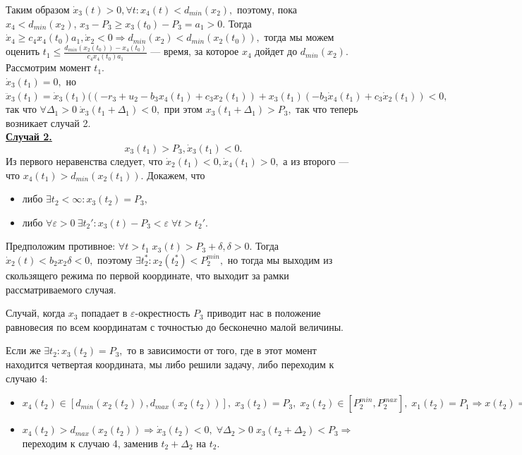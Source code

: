 \documentclass[11pt]{article}
\theoremstyle{definition}
\begin{document}
Таким образом $\dot x_3(t) > 0, \forall t : x_4(t) < d_{min}(x_2),$ поэтому, пока $x_4 < d_{min}(x_2)$, $ x_3 - P_3 \geqslant x_3(t_0) - P_3 = a_1 > 0.$ Тогда $\dot x_4 \geqslant c_4x_4(t_0)a_1, \dot x_2 < 0 \Rightarrow d_{min}(x_2) < d_{min}(x_2(t_0)),$ тогда мы можем оценить $t_1 \leqslant \frac{d_{min}(x_2(t_0)) - x_4(t_0)}{c_4x_4(t_0)a_1}$ --- время, за которое $x_4$ дойдет до $d_{min}(x_2)$.\\
Рассмотрим момент $t_1.$ \\
$\dot x_3(t_1) = 0,$ но $\ddot x_3(t_1) = \dot x_3(t_1)((-r_3 + u_2 - b_3x_4(t_1) + c_3x_2(t_1)) + x_3(t_1)(-b_3\dot x_4(t_1) + c_3 \dot x_2(t_1)) < 0,$ так что $\forall \Delta_1 > 0 \; \dot x_3(t_1 + \Delta_1) < 0,$ при этом $x_3(t_1 + \Delta_1) > P_3,$ так что теперь возникает случай 2.\\

\underline{\bf Случай 2.}
$$x_3(t_1) > P_3, \dot x_3(t_1) < 0.$$
Из первого неравенства следует, что $\dot x_2(t_1) < 0, \dot x_4(t_1) > 0,$ а из второго --- что $x_4(t_1) > d_{min}(x_2(t_1)).$ Докажем, что 
\begin{itemize}
	\item либо $\exists t_2 < \infty:  x_3(t_2) = P_3,$
	\item либо $\forall \varepsilon > 0 \: \exists t_2' : x_3(t) - P_3 < \varepsilon \; \forall t > t_2'.$
\end{itemize}
Предположим противное: $\forall t > t_1 \; x_3(t) > P_3 + \delta, \delta > 0.$ Тогда $\dot x_2(t) < b_2x_2\delta < 0,$ поэтому $\exists t_2^* : x_2(t_2^*) < P_2^{min},$ но тогда мы выходим из скользящего режима по первой координате, что выходит за рамки рассматриваемого случая.

Случай, когда $x_3$ попадает в $\varepsilon$-окрестность $P_3$ приводит нас в положение равновесия по всем координатам с точностью до бесконечно малой величины.

Если же $\exists t_2 : x_3(t_2) = P_3,$ то в зависимости от того, где в этот момент находится четвертая координата, мы либо решили задачу, либо переходим к случаю 4:
\begin{itemize}
	\item $x_4(t_2) \in [d_{min}(x_2(t_2)), d_{max}(x_2(t_2))], \; x_3(t_2) = P_3, \; x_2(t_2) \in [P_2^{min}, P_2^{max}], \; x_1(t_2) = P_1 \Rightarrow x(t_2) = P(u).$
	\item $x_4(t_2) > d_{max}(x_2(t_2)) \Rightarrow \dot x_3(t_2) < 0, \; \forall \Delta_2 > 0 \; x_3(t_2 + \Delta_2) < P_3 \Rightarrow$ переходим к случаю 4, заменив $t_2 + \Delta_2$ на $t_2$.
\end{itemize}
\end{document}
